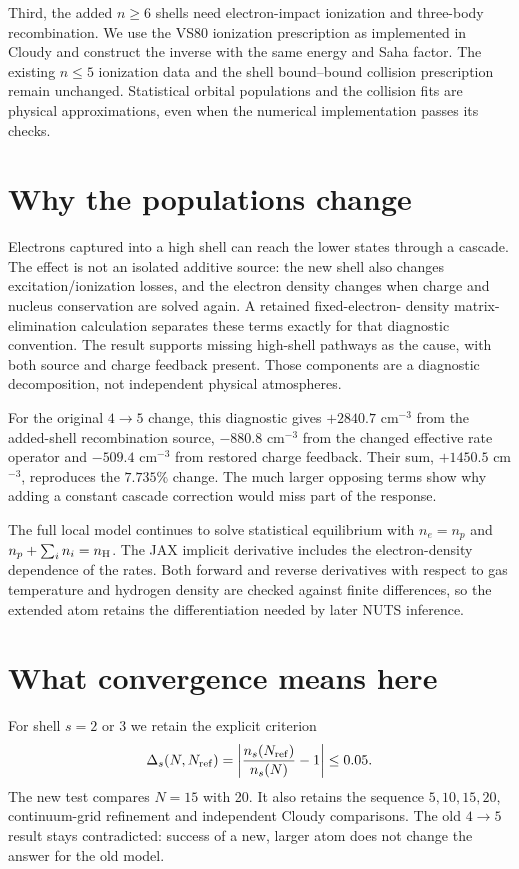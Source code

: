 \documentclass[10pt,a4paper]{article}
\begin{document}
Third, the added $n\ge6$ shells need electron-impact ionization and three-body
recombination. We use the VS80 ionization prescription as implemented in
Cloudy and construct the inverse with the same energy and Saha factor. The
existing $n\le5$ ionization data and the shell bound--bound collision
prescription remain unchanged. Statistical orbital populations and the
collision fits are physical approximations, even when the numerical
implementation passes its checks.

\section{Why the populations change}
Electrons captured into a high shell can reach the lower states through a
cascade. The effect is not an isolated additive source: the new shell also
changes excitation/ionization losses, and the electron density changes when
charge and nucleus conservation are solved again. A retained fixed-electron-
density matrix-elimination calculation separates these terms exactly for
that diagnostic convention. The result supports missing high-shell pathways
as the cause, with both source and charge feedback present. Those components
are a diagnostic decomposition, not independent physical atmospheres.

For the original $4\to5$ change, this diagnostic gives $+2840.7$ cm$^{-3}$
from the added-shell recombination source, $-880.8$ cm$^{-3}$ from the changed
effective rate operator and $-509.4$ cm$^{-3}$ from restored charge feedback.
Their sum, $+1450.5$ cm$^{-3}$, reproduces the $7.735\%$ change. The much larger
opposing terms show why adding a constant cascade correction would miss
part of the response.

The full local model continues to solve statistical equilibrium with
$n_e=n_p$ and $n_p+\sum_i n_i=n_{\rm H}$. The JAX implicit derivative includes
the electron-density dependence of the rates. Both forward and reverse derivatives with respect to gas temperature and
hydrogen density are checked against finite differences, so the
extended atom retains the differentiation needed by later NUTS inference.

\section{What convergence means here}
For shell $s=2$ or 3 we retain the explicit criterion
\[
 \Delta_s(N,N_{\rm ref})=
 \left|\frac{n_s(N_{\rm ref})}{n_s(N)}-1\right|\le0.05.
\]
The new test compares $N=15$ with 20. It also retains the sequence
$5,10,15,20$, continuum-grid refinement and independent Cloudy comparisons.
The old $4\to5$ result stays contradicted: success of a new, larger atom does
not change the answer for the old model.
\end{document}
